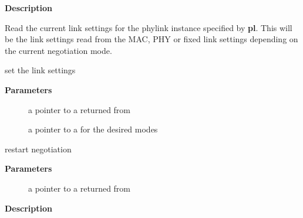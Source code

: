 \documentclass[a4paper,8pt,english]{sphinxmanual}
\begin{document}
\textbf{Description}

Read the current link settings for the phylink instance specified by \textbf{pl}.
This will be the link settings read from the MAC, PHY or fixed link
settings depending on the current negotiation mode.

\begin{fulllineitems}
\label{networking/kapi:c.phylink_ethtool_ksettings_set}
set the link settings

\end{fulllineitems}


\textbf{Parameters}
\begin{description}
\item[{}] \leavevmode
a pointer to a {\hyperref[networking/kapi:c.phylink]{\emph{}}} returned from {\hyperref[networking/kapi:c.phylink_create]{\emph{}}}

\item[{}] \leavevmode
a pointer to a  for the desired modes

\end{description}

\begin{fulllineitems}
\label{networking/kapi:c.phylink_ethtool_nway_reset}
restart negotiation

\end{fulllineitems}


\textbf{Parameters}
\begin{description}
\item[{}] \leavevmode
a pointer to a {\hyperref[networking/kapi:c.phylink]{\emph{}}} returned from {\hyperref[networking/kapi:c.phylink_create]{\emph{}}}

\end{description}

\textbf{Description}
\end{document}
